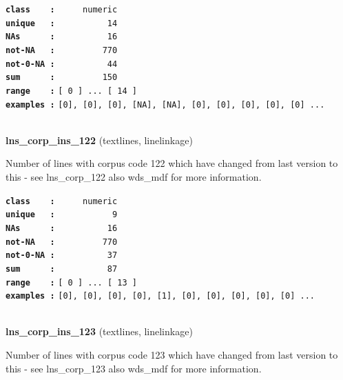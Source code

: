 \documentclass[]{article}
\begin{document}
\textbf{\texttt{class\ \ \ \ :}} \texttt{~~~~~numeric}\\
\textbf{\texttt{unique\ \ \ :}} \texttt{~~~~~~~~~~14}\\
\textbf{\texttt{NAs\ \ \ \ \ \ :}} \texttt{~~~~~~~~~~16}\\
\textbf{\texttt{not-NA\ \ \ :}} \texttt{~~~~~~~~~770}\\
\textbf{\texttt{not-0-NA\ :}} \texttt{~~~~~~~~~~44}\\
\textbf{\texttt{sum\ \ \ \ \ \ :}} \texttt{~~~~~~~~~150}\\
\textbf{\texttt{range\ \ \ \ :}}
\texttt{{[}\ 0\ {]}\ ...\ {[}\ 14\ {]}}\\
\textbf{\texttt{examples\ :}}
\texttt{{[}0{]},\ {[}0{]},\ {[}0{]},\ {[}NA{]},\ {[}NA{]},\ {[}0{]},\ {[}0{]},\ {[}0{]},\ {[}0{]},\ {[}0{]}\ ...}\\

~

\textbf{lns\_corp\_ins\_122} (textlines, linelinkage)

Number of lines with corpus code 122 which have changed from last
version to this - see lns\_corp\_122 also wds\_mdf for more information.

\textbf{\texttt{class\ \ \ \ :}} \texttt{~~~~~numeric}\\
\textbf{\texttt{unique\ \ \ :}} \texttt{~~~~~~~~~~~9}\\
\textbf{\texttt{NAs\ \ \ \ \ \ :}} \texttt{~~~~~~~~~~16}\\
\textbf{\texttt{not-NA\ \ \ :}} \texttt{~~~~~~~~~770}\\
\textbf{\texttt{not-0-NA\ :}} \texttt{~~~~~~~~~~37}\\
\textbf{\texttt{sum\ \ \ \ \ \ :}} \texttt{~~~~~~~~~~87}\\
\textbf{\texttt{range\ \ \ \ :}}
\texttt{{[}\ 0\ {]}\ ...\ {[}\ 13\ {]}}\\
\textbf{\texttt{examples\ :}}
\texttt{{[}0{]},\ {[}0{]},\ {[}0{]},\ {[}0{]},\ {[}1{]},\ {[}0{]},\ {[}0{]},\ {[}0{]},\ {[}0{]},\ {[}0{]}\ ...}\\

~

\textbf{lns\_corp\_ins\_123} (textlines, linelinkage)

Number of lines with corpus code 123 which have changed from last
version to this - see lns\_corp\_123 also wds\_mdf for more information.
\end{document}
